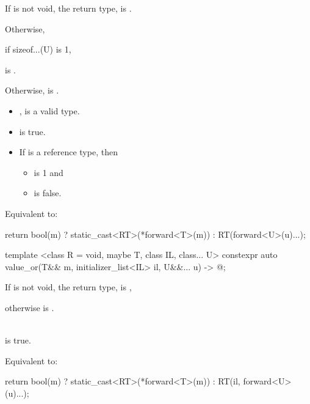\begin{itemdescr}
\pnum
If  is not void, the return type,  is .

Otherwise,

if sizeof...(U) is 1,

 is .

Otherwise,  is .

\pnum
\mandates
\begin{itemize}
\item {}, is a valid type.
\item {} is true.
\item If  is a reference type, then
  \begin{itemize}
  \item {} is 1 and
  \item {} is false.
  \end{itemize}
\end{itemize}
\pnum
\effects
Equivalent to:
\begin{codeblock}
return bool(m) ? static_cast<RT>(*forward<T>(m)) : RT(forward<U>(u)...);
\end{codeblock}

\end{itemdescr}

%
\begin{itemdecl}
template <class R = void, maybe T, class IL, class... U>
    constexpr auto value_or(T&& m, initializer_list<IL> il, U&&... u) -> @\seebelow@;
\end{itemdecl}

\begin{itemdescr}
\pnum
If  is not void, the return type,  is ,

otherwise  is .

\pnum
\mandates
{} \\
   is true.

\pnum
\effects
Equivalent to:
\begin{codeblock}
return bool(m) ? static_cast<RT>(*forward<T>(m)) : RT(il, forward<U>(u)...);
\end{codeblock}
\end{itemdescr}

